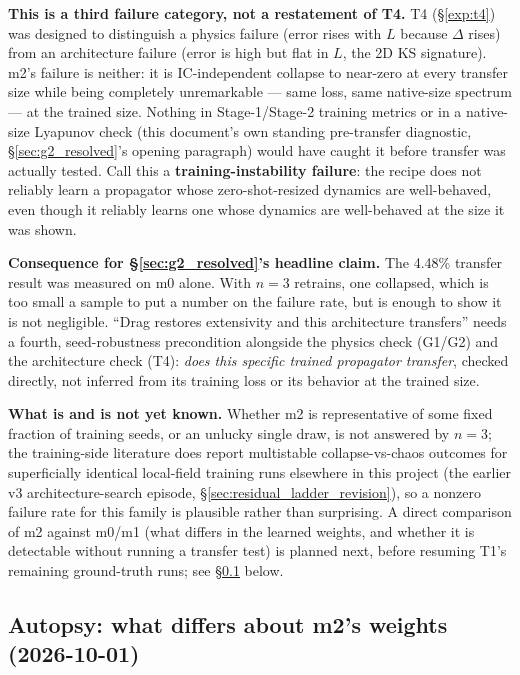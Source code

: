 \documentclass[11pt]{article}
\begin{document}
\textbf{This is a third failure category, not a restatement of T4.} T4
(\S\ref{exp:t4}) was designed to distinguish a physics failure (error
rises with $L$ because $\Delta$ rises) from an architecture failure
(error is high but flat in $L$, the 2D KS signature). m2's failure is
neither: it is IC-independent collapse to near-zero at every transfer
size while being completely unremarkable --- same loss, same native-size
spectrum --- at the trained size. Nothing in Stage-1/Stage-2 training
metrics or in a native-size Lyapunov check (this document's own standing
pre-transfer diagnostic, \S\ref{sec:g2_resolved}'s opening paragraph)
would have caught it before transfer was actually tested. Call this a
\textbf{training-instability failure}: the recipe does not reliably learn
a propagator whose zero-shot-resized dynamics are well-behaved, even
though it reliably learns one whose dynamics are well-behaved at the
size it was shown.

\textbf{Consequence for \S\ref{sec:g2_resolved}'s headline claim.} The
4.48\% transfer result was measured on m0 alone. With $n=3$ retrains, one
collapsed, which is too small a sample to put a number on the failure
rate, but is enough to show it is not negligible. ``Drag restores
extensivity and this architecture transfers'' needs a fourth,
seed-robustness precondition alongside the physics check (G1/G2) and the
architecture check (T4): \emph{does this specific trained propagator
transfer}, checked directly, not inferred from its training loss or its
behavior at the trained size.

\textbf{What is and is not yet known.} Whether m2 is representative of
some fixed fraction of training seeds, or an unlucky single draw, is not
answered by $n=3$; the training-side literature does report multistable
collapse-vs-chaos outcomes for superficially identical local-field
training runs elsewhere in this project (the earlier v3 architecture-search
episode, \S\ref{sec:residual_ladder_revision}), so a nonzero failure rate
for this family is plausible rather than surprising. A direct comparison
of m2 against m0/m1 (what differs in the learned weights, and whether it
is detectable without running a transfer test) is planned next, before
resuming T1's remaining ground-truth runs; see \S\ref{sec:m2_autopsy} below.

\subsection{Autopsy: what differs about m2's weights (2026-10-01)}
\label{sec:m2_autopsy}
\end{document}
